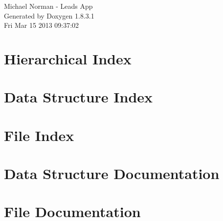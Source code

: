 \documentclass{book}
\begin{document}
\hypersetup{pageanchor=false,citecolor=blue}
\begin{titlepage}
\vspace*{7cm}
\begin{center}
{\Large Michael Norman -\/ Leads App }\\
\vspace*{1cm}
{\large Generated by Doxygen 1.8.3.1}\\
\vspace*{0.5cm}
{\small Fri Mar 15 2013 09:37:02}\\
\end{center}
\end{titlepage}
\clearemptydoublepage
{}
\tableofcontents
\clearemptydoublepage
{}
\hypersetup{pageanchor=true,citecolor=blue}
\chapter{Hierarchical Index}

\chapter{Data Structure Index}

\chapter{File Index}

\chapter{Data Structure Documentation}




\chapter{File Documentation}
















\printindex
\end{document}
